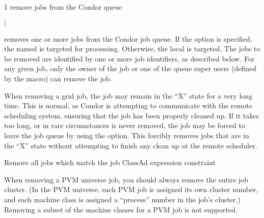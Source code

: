 \begin{ManPage}{\label{man-condor-rm}}{1}
{remove jobs from the Condor queue}
\Synopsis {}
\ToolArgsBase

\ToolDebugOption
{}
\ToolLocate
\ToolJobs
$|$  \Dots

\ToolDebugOption
\ToolLocate
\ToolAll


\Description

 removes one or more jobs from the Condor job queue.  
If the  option is specified, the named  is targeted
for processing.  
Otherwise, the local  is targeted.
The jobs to be removed are identified by one or more job identifiers, as
described below.
For any given job, only the owner of the job or one of the queue super users
(defined by the  macro) can remove the job.

When removing a grid job, the job may remain in
the ``X'' state for a very long time. 
This is normal, as Condor is attempting to communicate with the
remote scheduling system, 
ensuring that the job has been properly cleaned up.
If it takes too long, or in rare circumstances is never removed,
the job may be forced to
leave the job queue by using the  option.
This forcibly removes jobs that are in the ``X'' state without attempting
to finish any clean up at the remote scheduler.

\begin{Options}
	\ToolArgsBaseDesc
	\ToolLocateDesc
        \ToolDebugDesc
	 {Remove all jobs which match
	                the job ClassAd expression constraint}
\end{Options}

\GenRem

When removing a PVM universe job, you should always remove the entire
job cluster.  (In the PVM universe, each PVM job is assigned its own
cluster number, and each machine class is assigned a ``process''
number in the job's cluster.)  Removing a subset of the machine
classes for a PVM job is not supported.


\end{ManPage}
